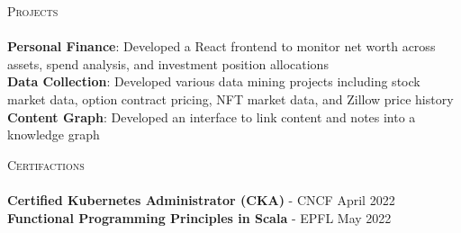 \documentclass[a4paper]{article}
\newcommand{\lineunder} {
    \vspace*{-8pt} \\
    \hspace*{-18pt} \hrulefill \\
}
\newcommand{\header} [1] {
    {\hspace*{-18pt}\vspace*{6pt} \textsc{#1}}
    \vspace*{-6pt} \lineunder
}
\begin{document}
\header{Projects}
{\textbf{Personal Finance}}: Developed a React frontend to monitor net worth across assets, spend analysis, and investment position allocations\\
\vspace*{1mm}
{\textbf{Data Collection}}: Developed various data mining projects including stock market data, option contract pricing, NFT market data, and Zillow price history\\
\vspace*{1mm}
{\textbf{Content Graph}}: Developed an interface to link content and notes into a knowledge graph\\
\vspace*{3mm}

\header{Certifactions}
\textbf{Certified Kubernetes Administrator (CKA)} - CNCF \hfill April 2022\\
\vspace*{1mm}
\textbf{Functional Programming Principles in Scala} - EPFL \hfill May 2022\\

\ 
\end{document}
